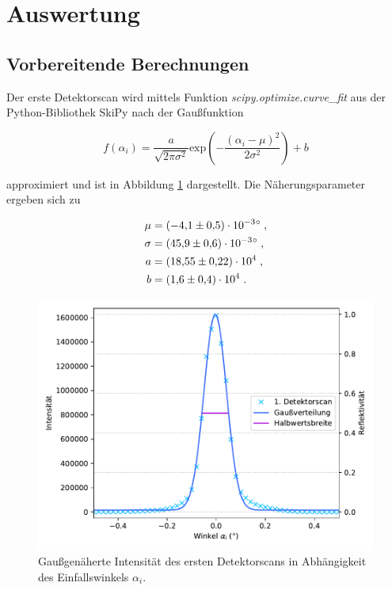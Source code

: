 \vspace{+15pt}
\section{Auswertung}
\label{sec:Auswertung}

\vspace{+15pt}
\subsection{Vorbereitende Berechnungen}
\vspace{+5pt}

Der erste Detektorscan wird mittels Funktion 
\textit{scipy.optimize.curve\_fit} aus der Python-Bibliothek SkiPy nach der Gaußfunktion

\begin{equation}
    f(\alpha_i) = \frac{a}{\sqrt{2 \pi \sigma^2}} \text{exp}\left(- \frac{(\alpha_i - \mu)^2}{2\sigma^2}\right) + b
\end{equation}

\vspace{+10pt}
approximiert und ist in Abbildung \ref{fig:plot1} dargestellt.
Die Näherungsparameter ergeben sich zu
\vspace{-25pt}

\begin{align*}
    \mu &= (\num{-4.1 +- 0.5}) \cdot 10^{-3}\si{\degree} \; ,\\
    \sigma &= (\num{45.9 +- 0.6}) \cdot 10^{-3} \si{\degree} \; ,\\
    a &= (\num{18.55 +- 0.22}) \cdot 10^4 \; ,\\
    b &= (\num{1.6 +- 0.4}) \cdot 10^4 \; .
\end{align*}

\vspace{-7pt}
\begin{figure}[H]
    \centering
    \includegraphics[scale=0.7]{content/plot1.pdf}
    \vspace{-10pt}
    \caption{Gaußgenäherte Intensität des ersten Detektorscans in Abhängigkeit des Einfallswinkels $\alpha_i$.}
    \label{fig:plot1}
\end{figure}

